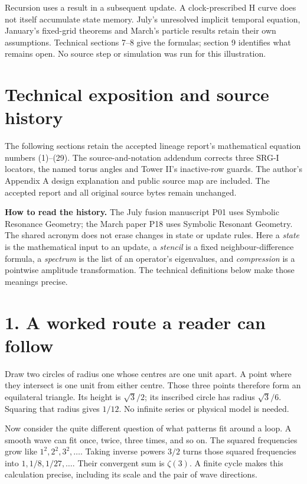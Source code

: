 \documentclass[11pt,a4paper]{article}
\begin{document}
Recursion uses a result in a subsequent update. A clock-prescribed H
curve does not itself accumulate state memory.
July's unresolved implicit temporal equation, January's fixed-grid theorems
and March's particle results retain their own assumptions.
Technical sections 7--8 give the formulas; section 9 identifies what remains open.
No source step or simulation was run for this illustration.
\clearpage

\section*{Technical exposition and source history}
The following sections retain the accepted lineage report's mathematical
equation numbers (1)--(29). The source-and-notation addendum corrects three
SRG-I locators, the named torus angles and Tower II's inactive-row guards.
The author's Appendix A design explanation and public source map are included.
The accepted report and all original source bytes remain unchanged.

\textbf{How to read the history.}
The July fusion manuscript P01 uses Symbolic Resonance Geometry;
the March paper P18 uses Symbolic Resonant Geometry.
The shared acronym does not erase changes in state or update rules.
Here a \emph{state} is the mathematical input to an update, a
\emph{stencil} is a fixed neighbour-difference formula, a
\emph{spectrum} is the list of an operator's eigenvalues, and
\emph{compression} is a pointwise amplitude transformation.
The technical definitions below make those meanings precise.

\tableofcontents
\clearpage
\section*{1. A worked route a reader can follow}

Draw two circles of radius one whose centres are one unit apart. A point where they intersect is one unit from either centre. Those three points therefore form an equilateral triangle. Its height is $\sqrt3/2$; its inscribed circle has radius $\sqrt3/6$. Squaring that radius gives \textbf{$1/12$}. No infinite series or physical model is needed.


Now consider the quite different question of what patterns fit around a loop. A smooth wave can fit once, twice, three times, and so on. The squared frequencies grow like $1^2,2^2,3^2,\ldots$. Taking inverse powers $3/2$ turns those squared frequencies into $1,1/8,1/27,\ldots$. Their convergent sum is \textbf{$\zeta(3)$}. A finite cycle makes this calculation precise, including its scale and the pair of wave directions.
\end{document}
